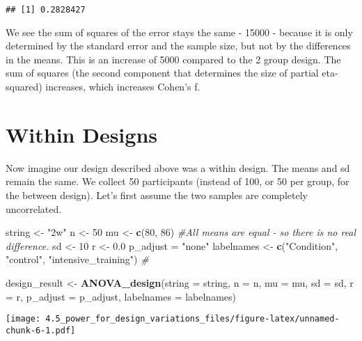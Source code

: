 \documentclass[]{article}
\newenvironment{Shaded}{\begin{snugshade}}{\end{snugshade}}
\newcommand{\KeywordTok}[1]{\textcolor[rgb]{0.13,0.29,0.53}{\textbf{#1}}}
\newcommand{\DataTypeTok}[1]{\textcolor[rgb]{0.13,0.29,0.53}{#1}}
\newcommand{\DecValTok}[1]{\textcolor[rgb]{0.00,0.00,0.81}{#1}}
\newcommand{\FloatTok}[1]{\textcolor[rgb]{0.00,0.00,0.81}{#1}}
\newcommand{\StringTok}[1]{\textcolor[rgb]{0.31,0.60,0.02}{#1}}
\newcommand{\CommentTok}[1]{\textcolor[rgb]{0.56,0.35,0.01}{\textit{#1}}}
\newcommand{\NormalTok}[1]{#1}
\begin{document}
\begin{verbatim}
## [1] 0.2828427
\end{verbatim}

We see the sum of squares of the error stays the same - 15000 - because
it is only determined by the standard error and the sample size, but not
by the differences in the means. This is an increase of 5000 compared to
the 2 group design. The sum of squares (the second component that
determines the size of partial eta-squared) increases, which increases
Cohen's f.

\section{Within Designs}\label{within-designs}

Now imagine our design described above was a within design. The means
and sd remain the same. We collect 50 participants (instead of 100, or
50 per group, for the between design). Let's first assume the two
samples are completely uncorrelated.

\begin{Shaded}
\begin{Highlighting}[]
\NormalTok{string <-}\StringTok{ "2w"}
\NormalTok{n <-}\StringTok{ }\DecValTok{50}
\NormalTok{mu <-}\StringTok{ }\KeywordTok{c}\NormalTok{(}\DecValTok{80}\NormalTok{, }\DecValTok{86}\NormalTok{) }\CommentTok{#All means are equal - so there is no real difference.}
\NormalTok{sd <-}\StringTok{ }\DecValTok{10}
\NormalTok{r <-}\StringTok{ }\FloatTok{0.0}
\NormalTok{p_adjust =}\StringTok{ "none"}
\NormalTok{labelnames <-}\StringTok{ }\KeywordTok{c}\NormalTok{(}\StringTok{"Condition"}\NormalTok{, }\StringTok{"control"}\NormalTok{, }\StringTok{"intensive_training"}\NormalTok{) }\CommentTok{#}

\NormalTok{design_result <-}\StringTok{ }\KeywordTok{ANOVA_design}\NormalTok{(}\DataTypeTok{string =}\NormalTok{ string,}
                   \DataTypeTok{n =}\NormalTok{ n, }
                   \DataTypeTok{mu =}\NormalTok{ mu, }
                   \DataTypeTok{sd =}\NormalTok{ sd, }
                   \DataTypeTok{r =}\NormalTok{ r, }
                   \DataTypeTok{p_adjust =}\NormalTok{ p_adjust,}
                   \DataTypeTok{labelnames =}\NormalTok{ labelnames)}
\end{Highlighting}
\end{Shaded}

\texttt{[image: 4.5\_power\_for\_design\_variations\_files/figure-latex/unnamed-chunk-6-1.pdf]}
\end{document}
